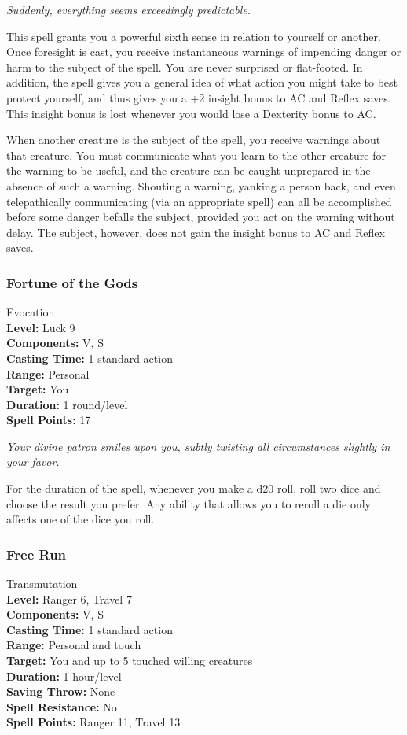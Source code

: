 \emph{Suddenly, everything seems exceedingly predictable.}

This spell grants you a powerful sixth sense in relation to yourself or another. 
Once foresight is cast, you receive instantaneous warnings of impending danger or harm to the subject of the spell. 
You are never surprised or flat-footed. 
In addition, the spell gives you a general idea of what action you might take to best protect yourself,
and thus gives you a +2 insight bonus to AC and Reflex saves. 
This insight bonus is lost whenever you would lose a Dexterity bonus to AC.

When another creature is the subject of the spell, you receive warnings about that creature. 
You must communicate what you learn to the other creature for the warning to be useful, 
and the creature can be caught unprepared in the absence of such a warning. 
Shouting a warning, yanking a person back, and even telepathically communicating (via an appropriate spell) 
can all be accomplished before some danger befalls the subject, provided you act on the warning without delay. 
The subject, however, does not gain the insight bonus to AC and Reflex saves.


\subsubsection{Fortune of the Gods}
\label{Spell:FortuneOfTheGods}
Evocation
\\ \textbf{Level:} Luck 9
\\ \textbf{Components:} V, S
\\ \textbf{Casting Time:} 1 standard action
\\ \textbf{Range:} Personal
\\ \textbf{Target:} You
\\ \textbf{Duration:} 1 round/level
\\ \textbf{Spell Points:} 17

\emph{Your divine patron smiles upon you, subtly twisting all circumstances slightly in your favor.}

For the duration of the spell, whenever you make a d20 roll, roll two dice and choose the result you prefer. Any ability that allows you to reroll a die only affects one of the dice you roll.
\subsubsection{Free Run}
\label{Spell:FreeRun}
Transmutation
\\ \textbf{Level:} Ranger 6, Travel 7
\\ \textbf{Components:} V, S
\\ \textbf{Casting Time:} 1 standard action
\\ \textbf{Range:} Personal and touch
\\ \textbf{Target:} You and up to 5 touched willing creatures
\\ \textbf{Duration:} 1 hour/level
\\ \textbf{Saving Throw:} None
\\ \textbf{Spell Resistance:} No
\\ \textbf{Spell Points:} Ranger 11, Travel 13

